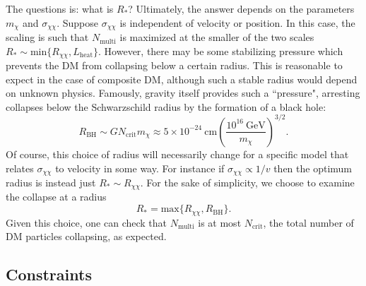\documentclass[preprintnumbers,amsmath,amssymb,prd,superscriptaddress]{revtex4}
\newcommand{\GeV}{\text{GeV}}
\newcommand{\cm}{\text{cm}}
\def\r{\right)}
\def\l{\left(}
\begin{document}
The questions is: what is $R_*$?
Ultimately, the answer depends on the parameters $m_\chi$ and $\sigma_{\chi \chi}$. 
Suppose $\sigma_{\chi \chi}$ is independent of velocity or position.
In this case, the scaling is such that $N_\text{multi}$ is maximized at the smaller of the two scales $R_* \sim \text{min}\{R_{\chi \chi}, L_\text{heat}\}$. 
However, there may be some stabilizing pressure which prevents the DM from collapsing below a certain radius.
This is reasonable to expect in the case of composite DM, although such a stable radius would depend on unknown physics. 
Famously, gravity itself provides such a ``pressure", arresting collapses below the Schwarzschild radius by the formation of a black hole:
\begin{equation}
R_\text{BH} \sim G N_\text{crit} m_\chi \approx 5 \times 10^{-24} ~\cm \l \frac{10^{16} ~\GeV}{m_\chi} \r^{3/2}.
\end{equation}
Of course, this choice of radius will necessarily change for a specific model that relates $\sigma_{\chi \chi}$ to velocity in some way. 
For instance if $\sigma_{\chi \chi} \propto 1/v$ then the optimum radius is instead just $R_* \sim R_{\chi \chi}$.
For the sake of simplicity, we choose to examine the collapse at a radius
\begin{equation}
R_* = \text{max}\{R_{\chi \chi}, R_\text{BH}\}.
\end{equation}
Given this choice, one can check that $N_\text{multi}$ is at most $N_\text{crit}$, the total number of DM particles collapsing, as expected.  

\subsection{Constraints}
\end{document}
